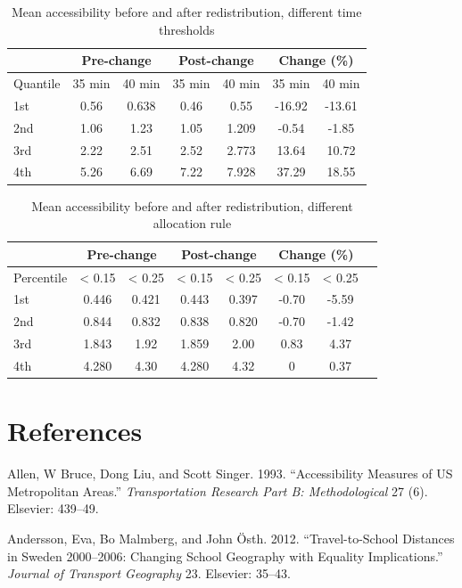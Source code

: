 \documentclass[3p,authoryear,preprint,review,12pt]{elsarticle}
\begin{document}
\setcounter{table}{0}
\renewcommand{\thetable}{A\arabic{table}}

\begin{table}[H]\caption{Mean accessibility before and after
redistribution, different time thresholds}\label{sen1}
\begin{tabular}[c]{lcccccc}\hline
 & \multicolumn{2}{c}{Pre-change} & \multicolumn{2}{c}{Post-change} & \multicolumn{2}{c}{ Change (\%)} \\ \hline
Quantile & 35 min & 40 min & 35 min & 40 min& 35 min & 40 min \\ \hline 
1st & 0.56 & 0.638 & 0.46 & 0.55 & -16.92 & -13.61 \tabularnewline
2nd & 1.06 & 1.23 & 1.05 & 1.209 & -0.54 & -1.85 \tabularnewline
3rd & 2.22 & 2.51 & 2.52 & 2.773 & 13.64 & 10.72 \tabularnewline
4th& 5.26 & 6.69 & 7.22 & 7.928 & 37.29 & 18.55 \tabularnewline
\bottomrule
\end{tabular}
\end{table}

\begin{table}[H]\caption{Mean accessibility before and after
redistribution, different allocation rule}\label{sen2}
\begin{tabular}[c]{lccccccc}\hline
 & \multicolumn{2}{c}{Pre-change} & \multicolumn{2}{c}{Post-change} & \multicolumn{2}{c}{ Change (\%)} \\ \hline
Percentile & < 0.15  & < 0.25 &  < 0.15  & < 0.25 & < 0.15  & < 0.25 \\ \hline 
1st & 0.446 & 0.421 &  0.443 & 0.397 & -0.70 & -5.59 \tabularnewline
2nd & 0.844 & 0.832 &  0.838 & 0.820 & -0.70 & -1.42 \tabularnewline
3rd & 1.843 & 1.92 &  1.859 & 2.00 & 0.83 & 4.37 \tabularnewline
4th & 4.280 & 4.30 &  4.280 & 4.32 & 0 & 0.37 \tabularnewline
\bottomrule
\end{tabular}
\end{table}

\section{References}\label{references}

Allen, W Bruce, Dong Liu, and Scott Singer. 1993. ``Accessibility
Measures of US Metropolitan Areas.'' \emph{Transportation Research Part
B: Methodological} 27 (6). Elsevier: 439--49.

Andersson, Eva, Bo Malmberg, and John {Ö}sth. 2012. ``Travel-to-School
Distances in Sweden 2000--2006: Changing School Geography with Equality
Implications.'' \emph{Journal of Transport Geography} 23. Elsevier:
35--43.
\end{document}
